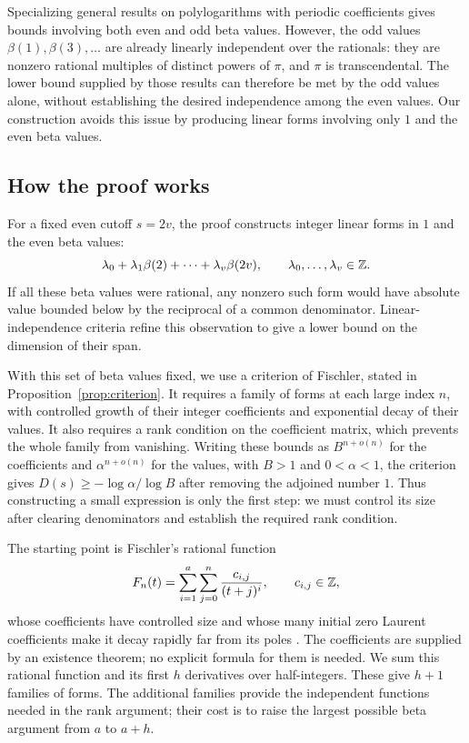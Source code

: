 Specializing general results on polylogarithms with periodic coefficients
\cite{M26} gives bounds involving both even and odd beta values.
However, the odd values $\beta(1),\beta(3),\ldots$ are already linearly
independent over the rationals: they are nonzero rational multiples of
distinct powers of $\pi$, and $\pi$ is transcendental.
The lower bound supplied by those results can therefore be met by the odd
values alone, without establishing the desired independence among the even
values. Our construction avoids this issue by producing linear forms
involving only $1$ and the even beta values.

\subsection{How the proof works}

For a fixed even cutoff $s=2v$, the proof constructs integer linear forms
in $1$ and the even beta values:
\[
 \lambda_0+\lambda_1\beta(2)+\cdots+\lambda_v\beta(2v),
 \qquad \lambda_0,\ldots,\lambda_v\in\mathbb Z.
\]
If all these beta values were rational, any nonzero such form would have
absolute value bounded below by the reciprocal of a common denominator.
Linear-independence criteria refine this observation to give a lower bound
on the dimension of their span.

With this set of beta values fixed, we use a criterion of Fischler, stated in
Proposition~\ref{prop:criterion}. It requires a family of forms at each
large index $n$, with controlled growth of their integer coefficients and
exponential decay of their values. It also requires a rank condition on
the coefficient matrix, which prevents the whole family from vanishing.
Writing these bounds as $B^{n+o(n)}$ for the coefficients and
$\alpha^{n+o(n)}$ for the values, with $B>1$ and $0<\alpha<1$, the
criterion gives $D(s)\geq-\log\alpha/\log B$ after removing the
adjoined number $1$. Thus constructing a small expression is only the first step:
we must control its size after clearing denominators and establish the
required rank condition.

The starting point is Fischler's rational function
\[
 F_n(t)=\sum_{i=1}^{a}\sum_{j=0}^{n}\frac{c_{i,j}}{(t+j)^i},
 \qquad c_{i,j}\in\mathbb Z,
\]
whose coefficients have controlled size and whose many initial zero
Laurent coefficients make it decay rapidly far from its poles
\cite[Theorem~4]{F26}. The coefficients are supplied by an existence
theorem; no explicit formula for them is needed.
We sum this rational function and its first $h$ derivatives over
half-integers. These give $h+1$ families of forms. The additional
families provide the independent functions needed in the rank argument;
their cost is to raise the largest possible beta argument from $a$ to
$a+h$.

